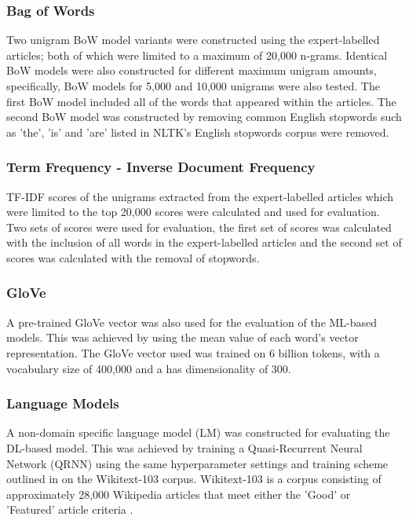 \documentclass[a4paper,twoside,phd]{BYUPhys}
\begin{document}
\subsubsection{Bag of Words}
\label{sec:FeatureSelectionBoW}
Two unigram BoW model variants were constructed using the expert-labelled articles; both of which were limited to a maximum of 20,000 n-grams. Identical BoW models were also constructed for different maximum unigram amounts, specifically, BoW models for 5,000 and 10,000 unigrams were also tested. The first BoW model included all of the words that appeared within the articles. The second BoW model was constructed by removing common English stopwords such as 'the', 'is' and 'are' listed in NLTK's English stopwords corpus \cite{Bird2009} were removed.

\subsubsection{Term Frequency - Inverse Document Frequency}
\label{sec:FeatureSelectionTFIDF}
TF-IDF scores of the unigrams extracted from the expert-labelled articles which were limited to the top 20,000 scores were calculated and used for evaluation. Two sets of scores were used for evaluation, the first set of scores was calculated with the inclusion of all words in the expert-labelled articles and the second set of scores was calculated with the removal of stopwords.

\subsubsection{GloVe}
\label{sec:FeatureSelectionGloVe}

A pre-trained GloVe vector \cite{pennington2014glove} was also used for the evaluation of the ML-based models. This was achieved by using the mean value of each word's vector representation. The GloVe vector used was trained on 6 billion tokens, with a vocabulary size of 400,000 and a has dimensionality of 300.

\subsubsection{Language Models}
\label{sec:FeatureSelectionLM}

A non-domain specific language model (LM) was constructed for evaluating the DL-based model. This was achieved by training a Quasi-Recurrent Neural Network (QRNN) using the same hyperparameter settings and training scheme outlined in \cite{bradbury2016quasi} on the Wikitext-103 corpus. Wikitext-103 is a corpus consisting of approximately 28,000 Wikipedia articles that meet either the 'Good' or 'Featured' article criteria \cite{Merity2016}. \newline
\end{document}
